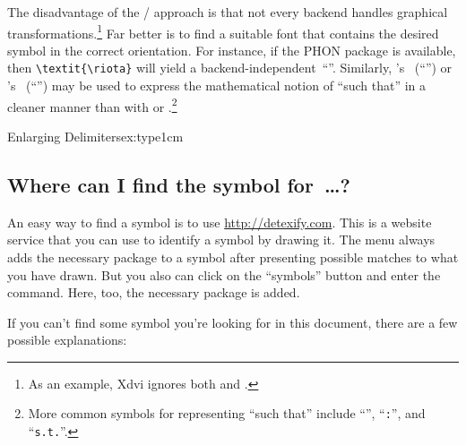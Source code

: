   The disadvantage
  of the / approach is that not
  every \tex backend handles graphical transformations.\footnote{As an
  example, Xdvi ignores both  and
  \cmd{\rotatebox}.}  Far better is to find a suitable font that
  contains the desired symbol in the correct orientation.  For
  instance, if the PHON package is available, then
  \verb|\textit{\riota}| will yield a
  backend-independent~``\textit{\cmd{\riota}}''.
  Similarly,\label{page:such-that} \TIPA's
  ~(``\textrevepsilon'') or \WIPA's
  ~(``\textrevepsilon'') may be used to express the
  mathematical notion of ``such that'' in a cleaner
  manner than with  or
  \cmd{\rotatebox}.\footnote{More common symbols for representing
  ``such that'' include ``\texttt{\textbar}'',
  ``\texttt{:}'', and ``\texttt{s.t.}''.}



\begin{texexample}{Enlarging Delimiters}{ex:type1cm}
\newcommand{\makeBIG}[1]{\fontsize{1cm}{1cm}\selectfont\ensuremath{#1}}
  \makeBIG\>

\end{texexample}

\subsection{Where can I find the symbol for~\dots?}

\label{combining-symbols}

An easy way to find a symbol is to use \url{http://detexify.com}. This is a website service that you can use to identify a symbol by drawing it. The menu always adds the necessary package to a symbol after presenting possible matches to what you have drawn. But you also can click on the ``symbols'' button and enter the command. Here, too, the necessary package is added. 

If you can't find some symbol you're looking for in this document, there
are a few possible explanations:

